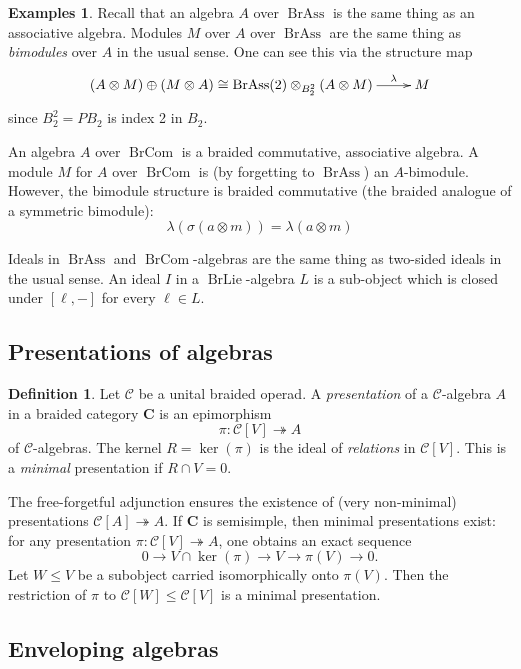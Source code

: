 \documentclass[12pt]{article}
\DeclareMathOperator{\BrAss}{BrAss}
\DeclareMathOperator{\BrLie}{BrLie}
\DeclareMathOperator{\BrCom}{BrCom}
\newcommand{\CC} {\mathcal{C}}
\newcommand{\bC} {\mathbf{C}}
\newcommand{\beqn}{\begin{equation}}
\newcommand{\eeqn}{\end{equation}}
\theoremstyle{plain}
\theoremstyle{definition}
\newtheorem{defn}[thm]{Definition}
\newtheorem{exmps}[thm]{Examples}
\theoremstyle{remark}
\begin{document}
\begin{exmps}

Recall that an algebra $A$ over $\BrAss$ is the same thing as an associative algebra.  Modules $M$ over $A$ over $\BrAss$ are the same thing as \emph{bimodules} over $A$ in the usual sense.  One can see this via the structure map
%
\beqn \label{l_r_eqn} \xymatrix{(A\otimes M ) \oplus (M \otimes A) \cong \BrAss(2) \otimes_{B_2^2}(A \otimes M) \ar[r]^-{\lambda} & M}\eeqn
%
since $B_2^2 = PB_2$ is index 2 in $B_2$.

An algebra $A$ over $\BrCom$ is a braided commutative, associative algebra.  A module $M$ for $A$ over $\BrCom$ is (by forgetting to $\BrAss$) an $A$-bimodule.  However, the bimodule structure is braided commutative (the braided analogue of a symmetric bimodule):
%
$$\lambda(\sigma(a \otimes m)) = \lambda(a \otimes m)$$

Ideals in $\BrAss$ and $\BrCom$-algebras are the same thing as two-sided ideals in the usual sense.  An ideal $I$ in a $\BrLie$-algebra $L$ is a sub-object which is closed under $[\ell, -]$ for every $\ell \in L$.

\end{exmps}

\subsection{Presentations of algebras} 

\begin{defn} Let $\CC$ be a unital braided operad.  A \emph{presentation} of a $\CC$-algebra $A$ in a braided category $\bC$ is an epimorphism
%
$$\pi: \CC[V] \twoheadrightarrow A$$
%
of $\CC$-algebras.  The kernel $R = \ker(\pi)$ is the ideal of \emph{relations} in $\CC[V]$.  This is a \emph{minimal} presentation if $R \cap V = 0$.

\end{defn}

The free-forgetful adjunction ensures the existence of (very non-minimal) presentations $\CC[A] \twoheadrightarrow A$.  If $\bC$ is semisimple, then minimal presentations exist: for any presentation $\pi: \CC[V] \twoheadrightarrow A$, one obtains an exact sequence
%
$$0 \to V \cap \ker(\pi) \to V \to \pi(V) \to 0.$$
%
Let $W \leq V$ be a subobject carried isomorphically onto $\pi(V)$.  Then the restriction of $\pi$ to $\CC[W] \leq \CC[V]$ is a minimal presentation.

\subsection{Enveloping algebras}
\end{document}
